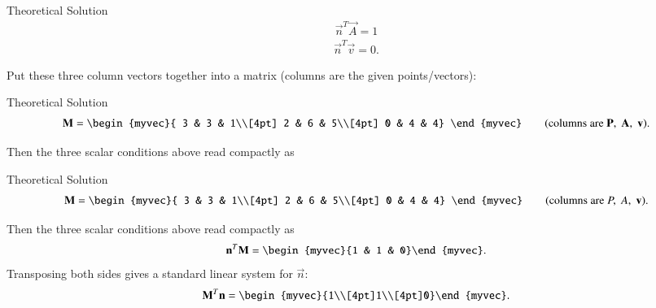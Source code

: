 \documentclass{beamer}
\begin{document}
\begin{frame}{Theoretical Solution}
\begin{align}
\vec{n}^T \vec{A} = 1
\end{align}
\begin{align}
\vec{n}^T \vec{v} = 0.
\end{align}

Put these three column vectors together into a matrix (columns are the given points/vectors):

\end{frame}
\begin{frame}{Theoretical Solution}
\begin{align}
\vec{M}=\begin{myvec}{
3 & 3 & 1\\[4pt]
2 & 6 & 5\\[4pt]
0 & 4 & 4}
\end{myvec}
\qquad\text{(columns are }\vec{P},\;\vec{A},\;\vec{v}\text{).}
\end{align}

Then the three scalar conditions above read compactly as
\end{frame}
\begin{frame}{Theoretical Solution}
\begin{align}
\vec{M}=\begin{myvec}{
3 & 3 & 1\\[4pt]
2 & 6 & 5\\[4pt]
0 & 4 & 4}
\end{myvec}
\qquad\text{(columns are }P,\;A,\;\vec{v}\text{).}
\end{align}

Then the three scalar conditions above read compactly as
\begin{align}
\vec{n}^T\vec{M} = \begin{myvec}{1 & 1 & 0}\end{myvec}.
\end{align}
Transposing both sides gives a standard linear system for \(\vec{n}\):
\begin{align}
\vec{M}^T \vec{n} = \begin{myvec}{1\\[4pt]1\\[4pt]0}\end{myvec}.
\end{align}
\end{frame}
\end{document}
